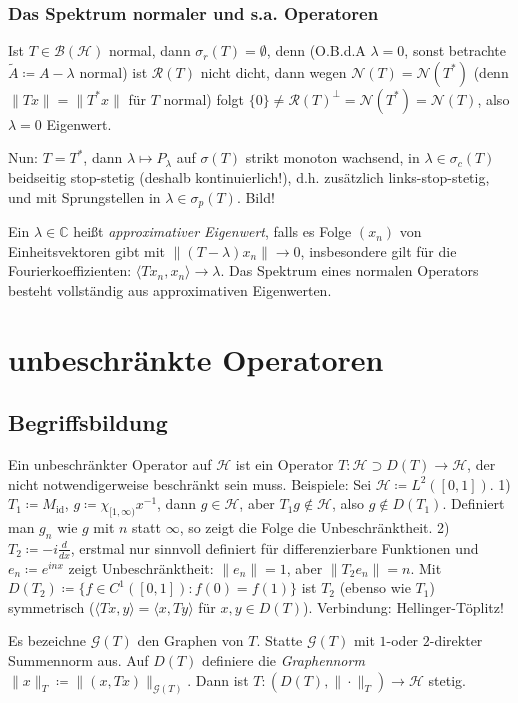 \documentclass[11pt,a4paper]{scrartcl}
\newcommand{\C}{\mathbb{C}} %
\newcommand{\Hc}{\mathcal{H}}
\newcommand{\B}{\mathcal{B}}
\newcommand{\G}{\mathcal{G}}
\newcommand{\Nc}{\mathcal{N}}
\newcommand{\Rc}{\mathcal{R}}
\theoremstyle{plain}
\theoremstyle{definition}
\theoremstyle{remark}
\DeclareMathOperator{\id}{id}
\begin{document}
\subsubsection{Das Spektrum normaler und s.a. Operatoren}

Ist $T\in \B(\Hc)$ normal, dann $\sigma_r(T)=\emptyset$, denn (O.B.d.A $\lambda=0$, sonst betrachte $\tilde A \coloneqq A-\lambda$ normal) ist $\Rc(T)$ nicht dicht, dann wegen $\Nc(T)=\Nc(T^*)$ (denn $\|Tx\|=\|T^*x\|$ für $T$ normal) folgt $\{0\} \neq \Rc(T)^\bot = \Nc(T^*) = \Nc(T)$, also $\lambda=0$ Eigenwert.

Nun: $T=T^*$, dann $\lambda \mapsto P_\lambda$ auf $\sigma(T)$ strikt monoton wachsend, in $\lambda \in \sigma_c(T)$ beidseitig stop-stetig (deshalb kontinuierlich!), d.h. zusätzlich links-stop-stetig,  und mit Sprungstellen in $\lambda \in \sigma_p(T)$. Bild!

Ein $\lambda\in \C$ heißt \emph{approximativer Eigenwert}, falls es Folge $(x_n)$ von Einheitsvektoren gibt mit $\|(T-\lambda)x_n\| \to 0$, insbesondere gilt für die Fourierkoeffizienten: $\langle Tx_n, x_n \rangle \to \lambda$. Das Spektrum eines normalen Operators besteht vollständig aus approximativen Eigenwerten.

\section{unbeschränkte Operatoren}

\subsection{Begriffsbildung}

Ein unbeschränkter Operator auf $\Hc$ ist ein Operator $T:\Hc \supset D(T) \to \Hc$, der nicht notwendigerweise beschränkt sein muss. Beispiele: Sei $\Hc\coloneqq L^2([0,1])$.  1) $T_1\coloneqq M_{\id}$, $g\coloneqq \chi_{[1,\infty)} x^{-1}$, dann $g\in \Hc$, aber $T_1g\not\in \Hc$, also $g\not\in D(T_1)$. Definiert man $g_n$ wie $g$ mit $n$ statt $\infty$, so zeigt die Folge die Unbeschränktheit.  2) $T_2\coloneqq -i \frac{d}{dx}$, erstmal nur sinnvoll definiert für differenzierbare Funktionen und $e_n\coloneqq e^{inx}$ zeigt Unbeschränktheit: $\|e_n\|=1$, aber $\|T_2 e_n\|=n$. Mit $D(T_2)\coloneqq \{f\in C^1([0,1]): f(0)=f(1) \}$ ist $T_2$ (ebenso wie $T_1$) symmetrisch ($\langle Tx,y\rangle = \langle x, Ty \rangle$ für $x,y\in D(T)$). Verbindung: Hellinger-Töplitz!

Es bezeichne $\G(T)$ den Graphen von $T$. Statte $\G(T)$ mit $1$-oder $2$-direkter Summennorm aus. Auf $D(T)$ definiere die \emph{Graphennorm} $\|x\|_T \coloneqq \|(x,Tx)\|_{\G(T)}$. Dann ist $T: (D(T), \|\cdot\|_T) \to \Hc$ stetig.
\end{document}
